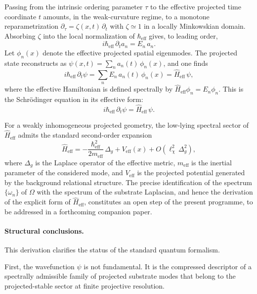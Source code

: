     Passing from the intrinsic ordering parameter $\tau$ to the effective projected time
    coordinate $t$ amounts, in the weak-curvature regime, to a monotone reparametrization
    $\partial_{\tau} = \zeta(x,t)\,\partial_t$ with $\zeta \simeq 1$ in a locally Minkowskian domain.
    Absorbing $\zeta$ into the local normalization of $\hbar_{\mathrm{eff}}$ gives, to leading order,
    \[
      i\hbar_{\mathrm{eff}}\,\partial_t a_n = E_n\,a_n.
    \]
    Let $\phi_n(x)$ denote the effective projected spatial eigenmodes.
    The projected state reconstructs as $\psi(x,t) = \sum_n a_n(t)\,\phi_n(x)$, and one finds
    \[
      i\hbar_{\mathrm{eff}}\,\partial_t \psi
      = \sum_n E_n\,a_n(t)\,\phi_n(x)
      = \hat{H}_{\mathrm{eff}}\,\psi,
    \]
    where the effective Hamiltonian is defined spectrally by $\hat{H}_{\mathrm{eff}}\phi_n = E_n\phi_n$.
    This is the Schr\"{o}dinger equation in its effective form:
    \[
      \boxed{i\hbar_{\mathrm{eff}}\,\partial_t \psi = \hat{H}_{\mathrm{eff}}\,\psi.}
    \]

    For a weakly inhomogeneous projected geometry, the low-lying spectral sector of
    $\hat{H}_{\mathrm{eff}}$ admits the standard second-order expansion
    \[
      \hat{H}_{\mathrm{eff}}
      = -\frac{\hbar_{\mathrm{eff}}^2}{2m_{\mathrm{eff}}}\,\Delta_g + V_{\mathrm{eff}}(x)
      + O\!\left(\ell_{\chi}^2\,\Delta_g^2\right),
    \]
    where $\Delta_g$ is the Laplace operator of the effective metric, $m_{\mathrm{eff}}$ is the
    inertial parameter of the considered mode, and $V_{\mathrm{eff}}$ is the projected potential
    generated by the background relational structure.
    The precise identification of the spectrum $\{\omega_n\}$ of $\Omega$ with the spectrum of
    the substrate Laplacian, and hence the derivation of the explicit form of
    $\hat{H}_{\mathrm{eff}}$, constitutes an open step of the present programme, to be addressed
    in a forthcoming companion paper.

  \paragraph{Structural conclusions.}

    This derivation clarifies the status of the standard quantum formalism.

    First, the wavefunction $\psi$ is not fundamental.
    It is the compressed descriptor of a spectrally admissible family of projected substrate
    modes that belong to the projected-stable sector at finite projective resolution.

